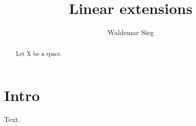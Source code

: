 \documentclass{elsarticle}
\makeatletter
\newcommand{\subjclass}[2][2010]{%
  \let\@oldtitle\@title
  \gdef\@title{\@oldtitle\footnotetext{#1 \emph{Mathematics subject classification.} #2}}}
\makeatother
\begin{document}
\begin{frontmatter}
\title{Linear extensions}
\author{Waldemar Sieg}
\address{Kazimierz Wielki University, Bydgoszcz, Poland}
\begin{abstract}
Let X be a space.
\end{abstract}
\subjclass{Primary: 26A15; Secondary: 26A21.}
\end{frontmatter}
\section{Intro}
Text.
\end{document}
